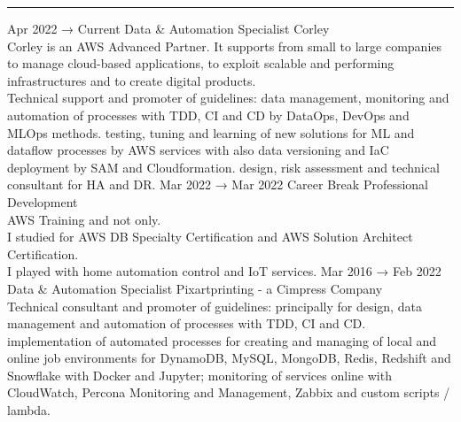 \documentclass[8pt]{stackoverflow-upgraded-version} %
\begin{document}
\textcolor{stackoverflow}{\hrule}
\vspace{\baselineskip} %
\begin{entrylist}
	\entry
		{Apr 2022 → Current}
		{Data \& Automation Specialist}
		{Corley}
		{\\
		 Corley is an AWS Advanced Partner. It supports from small to large companies to manage cloud-based applications,
		to exploit scalable and performing infrastructures and to create digital products.\vspace{1mm}\\
		 Technical support and promoter of guidelines: data management, monitoring and automation of processes with TDD, CI and CD by DataOps, DevOps and MLOps methods.
		 testing, tuning and learning of new solutions for ML and dataflow processes by AWS services with also data versioning and IaC deployment by SAM and Cloudformation.
		 design, risk assessment and technical consultant for HA and DR.}
	\entry
		{Mar 2022 → Mar 2022}
		{Career Break}
		{Professional Development}
		{\\
		AWS Training and not only.\\
		I studied for AWS DB Specialty Certification and AWS Solution Architect Certification.\\
		I played with home automation control and IoT services.}
	\entry
		{Mar 2016 → Feb 2022}
		{Data \& Automation Specialist}
		{Pixartprinting - a Cimpress Company}
		{\\
		 Technical consultant and promoter of guidelines: principally for design, data management and automation of processes with TDD, CI and CD.
		 implementation of automated processes for creating and managing of local and online job environments for DynamoDB, MySQL, MongoDB, Redis, Redshift and Snowflake with Docker and Jupyter; monitoring of services online with CloudWatch, Percona Monitoring and Management, Zabbix and custom scripts / lambda.
}
\end{entrylist}
\end{document}
